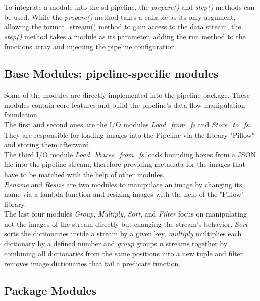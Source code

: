 To integrate a module into the sd-pipeline, the \textit{prepare()} and \textit{step()} methods can be used. While the \textit{prepare()} method takes a callable as its only argument, allowing the format\_stream() method to gain access to the data stream, the \textit{step()} method takes a module as its parameter, adding the run method to the functions array and injecting the pipeline configuration. 

\subsection{Base Modules: pipeline-specific modules}

Some of the modules are directly implemented into the pipeline package. These modules contain core features and build the pipeline's data flow manipulation foundation. 
\\

The first and second ones are the I/O modules \textit{Load\_from\_fs} and \textit{Store\_to\_fs}. They are responsible for loading images into the Pipeline via the library "Pillow" and storing them afterward.
\\

The third I/O module \textit{Load\_bboxes\_from\_fs} loads bounding boxes from a JSON file into the pipeline stream, therefore providing metadata for the images that have to be matched with the help of other modules.
\\

\textit{Rename} and \textit{Resize} are two modules to manipulate an image by changing its name via a lambda function and resizing images with the help of the "Pillow" library. 
\\

The last four modules \textit{Group}, \textit{Multiply}, \textit{Sort}, and \textit{Filter} focus on manipulating not the images of the stream directly but changing the stream's behavior. \textit{Sort} sorts the dictionaries inside a stream by a given key, \textit{multiply} multiplies each dictionary by a defined number and \textit{group} groups $n$ streams together by combining all dictionaries from the same positions into a new tuple and filter removes image dictionaries that fail a predicate function.
\\

\subsection{Package Modules}

